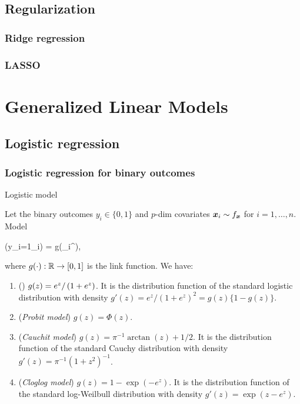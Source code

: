 \documentclass[10pt,a4paper]{book}
\begin{document}
\section{Regularization}\label{sec:regularization}
\subsection{Ridge regression}\label{sec:ridge_reg}



\subsection{LASSO}\label{sec:lasso}




\chapter{Generalized Linear Models}\label{chap:GLM}
\section{Logistic regression}\label{sec:logistic_reg}
\subsection{Logistic regression for binary outcomes}\label{sec:logistic_reg_binary}
\begin{defbox}{Logistic model}
	\begin{definition}\label{def:logistic_model}
		Let the binary outcomes $y_i\in\{0,1\}$ and $p$-dim covariates ${\boldsymbol x}_i\sim f_{\boldsymbol x}$ for $i=1,\ldots,n$. 
		Model 
		\begin{sequation*}
			\bbP(y_i=1\mid \x_i) = g(\x_i^\TT\bab),
		\end{sequation*}  
		where $g(\cdot):\mathbb R\to [0,1]$ is the link function. 
		We have:
		\begin{enumerate}
			\item () $g(z)={e^z}/\left( {1+e^z}\right)$. It is the distribution function of the standard logistic distribution with density $g'(z)=e^z/(1+e^z)^2=g(z)\{1-g(z)\}$. 
			\item ({\textit{Probit model}}) $g(z)=\Phi(z)$. 
			\item (\textit{Cauchit model}) $g(z)=\pi^{-1}\arctan(z)+1/2$. It is the distribution function of the standard Cauchy
			distribution with density $g'(z)=\pi^{-1}(1+z^2)^{-1}$. 
			\item (\textit{Cloglog model}) $g(z)=1-\exp(-e^{z})$. It is the distribution function of the standard log-Weilbull distribution with density $g'(z)=\exp(z-e^z)$. 
		\end{enumerate} 
	\end{definition}
\end{defbox}
\end{document}
